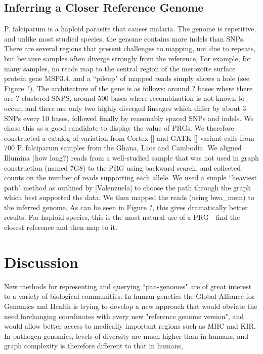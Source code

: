 \documentclass[runningheads,a4paper]{llncs}
\begin{document}
\subsection{Inferring a Closer Reference Genome}
P. falciparum is a haploid parasite that causes malaria. The genome is repetitive, and unlike most studied species, the genome contains more indels than SNPs. There are several regions that present challenges to mapping, not due to repeats, but because samples often diverge strongly from the reference, For example, for many samples, no reads map to the central region  of the merozoite surface protein gene MSP3.4, and a ``pileup" of mapped reads simply shows a hole (see Figure ?). The architecture of the gene is as follows: around ? bases where there are ? clustered SNPS, around 500 bases where recombination is not known to occur, and there are only two highly diverged lineages which differ by about 3 SNPs every 10 bases, followed finally by reasonably spaced SNPs and indels. We chose this as a good candidate to display the value of PRGs. We therefore constructed a catalog of variation from Cortex [] and GATK [] variant calls from 700 P. falciparum samples from the Ghana, Laos and Cambodia. We aligned Illumina (how long?) reads from a well-studied sample that was not used in graph construction (named 7G8) to the PRG using backward search, and collected counts on the number of reads supporting each allele. We used a simple ``heaviest path" method as outlined by [Valenzuela] to choose the path through the graph which best supported the data. We then mapped the reads (using bwa\_mem) to the inferred genome. As can be seen in Figure ?,  this gives dramatically better results. For haploid species, this is the most natural use of a PRG - find the closest reference and then map to it. 


\section{Discussion}
New methods for representing and querying ``pan-genomes" are of great interest to a variety of biological communities. In human genetics the Global Alliance for Genomics and Health is trying to develop a new approach that would obviate the need forchanging coordinates with every new "reference genome version", and would allow better access to medically important regions such as MHC and KIR. In pathogen genomics, levels of diversity are much higher than in humans, and graph complexity is therefore different to that in humans,
\end{document}
